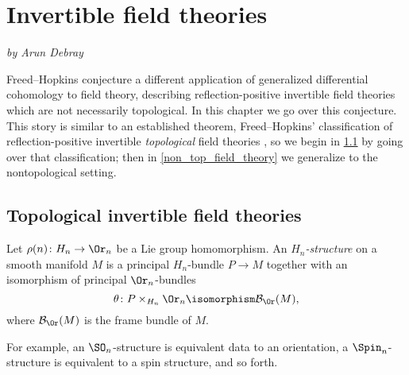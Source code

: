 
\section{Invertible field theories}
\textit{by Arun Debray}
\label{invertible_field_theories}

Freed--Hopkins \cite[\S 5.4]{FH21} conjecture a different application of generalized differential cohomology to
field theory, describing reflection-positive invertible field theories which are not necessarily topological. In
this chapter we go over this conjecture. This story is similar to an established theorem, Freed--Hopkins'
classification of reflection-positive invertible \emph{topological} field theories \cite{FH21}, so we begin in
\cref{top_IFT} by going over that classification; then in \cref{non_top_field_theory} we generalize to the
nontopological setting.
\subsection{Topological invertible field theories}
\label{top_IFT}
\begin{defn}
Let $\rho(n)\colon H_n\to\Or_n$ be a Lie group homomorphism. An \textit{$H_n$-structure} on a smooth manifold
$M$ is a principal $H_n$-bundle $P\to M$ together with an isomorphism of principal $\Or_n$-bundles \[\theta\colon
P\times_{H_n}\Or_n\isomorphism \mathcal B_{\Or}(M),\] where $\mathcal B_{\Or}(M)$ is the frame
bundle of $M$.
\end{defn}
%
%
For example, an $\SO_n$-structure is equivalent data to an orientation, a $\Spin_n$-structure is equivalent to a
spin structure, and so forth.


